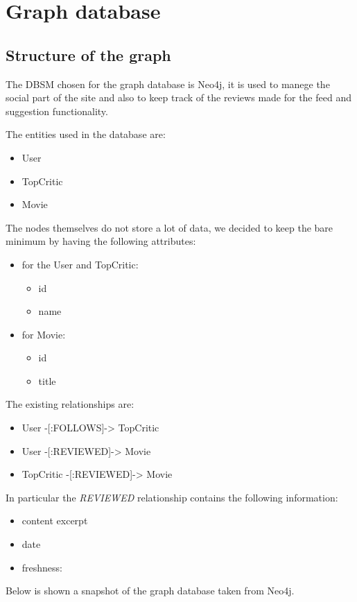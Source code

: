 %
%
\chapter{Graph database}
\justifying
\section{Structure of the graph}
The DBSM chosen for the graph database is Neo4j, it is used to manege the social part of the site and also to keep track of the reviews made for the feed and suggestion functionality.


The entities used in the database are:
\begin{itemize}
	\item User
	\item TopCritic
	\item Movie
\end{itemize}
The nodes themselves do not store a lot of data, we decided to keep the bare minimum by having the following attributes:
\begin{itemize}
	\item for the User and TopCritic:
	\begin{itemize}
		\item id
		\item name
	\end{itemize}
	\item for Movie:
	\begin{itemize}
		\item id
		\item title
	\end{itemize}
\end{itemize}
The existing relationships are:
\begin{itemize}
	\item User -[:FOLLOWS]-> TopCritic
	\item User -[:REVIEWED]-> Movie
	\item TopCritic -[:REVIEWED]-> Movie
\end{itemize}
In particular the \emph{REVIEWED} relationship contains the following information:
\begin{itemize}
	\item content excerpt 
	\item date
	\item freshness: 
\end{itemize}

Below is shown a snapshot of the graph database taken from Neo4j.

